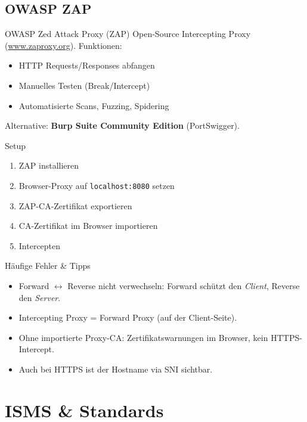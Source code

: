 \documentclass[a4paper, fontsize=7pt]{scrartcl}
\begin{document}
\subsection{OWASP ZAP}

\begin{mainbox}{OWASP Zed Attack Proxy (ZAP)}
Open-Source Intercepting Proxy (\url{www.zaproxy.org}). Funktionen:
\begin{itemize}
    \item HTTP Requests/Responses abfangen
    \item Manuelles Testen (Break/Intercept)
    \item Automatisierte Scans, Fuzzing, Spidering
\end{itemize}
Alternative: \textbf{Burp Suite Community Edition} (PortSwigger).
\end{mainbox}

\begin{subbox}{Setup}
\begin{enumerate}
    \item ZAP installieren
    \item Browser-Proxy auf \texttt{localhost:8080} setzen
    \item ZAP-CA-Zertifikat exportieren
    \item CA-Zertifikat im Browser importieren
    \item Intercepten
\end{enumerate}
\end{subbox}

\begin{subbox}{Häufige Fehler \& Tipps}
\begin{itemize}
    \item Forward $\leftrightarrow$ Reverse nicht verwechseln: Forward schützt
          den \emph{Client}, Reverse den \emph{Server}.
    \item Intercepting Proxy = Forward Proxy (auf der Client-Seite).
    \item Ohne importierte Proxy-CA: Zertifikatswarnungen im Browser, kein
          HTTPS-Intercept.
    \item Auch bei HTTPS ist der Hostname via SNI sichtbar.
\end{itemize}
\end{subbox}

\section{ISMS \& Standards}
\end{document}
